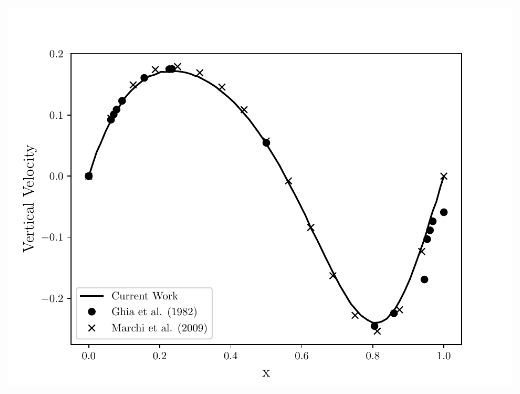 \begin{frame}
\begin{center}
\begin{columns}[c]
\begin{column}{0.55\textwidth} 
\hspace{0.5cm}
      \includegraphics[scale=0.41]{./images/Re_100_v_profile.pdf}\\
\end{column}

\end{columns}
\end{center}
\end{frame}




